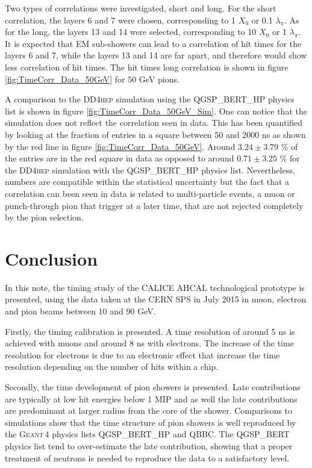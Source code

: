 \documentclass{JINST}
\newcommand\geant{\textsc{Geant\,4}\xspace}
\newcommand\ddhep{\textsc{DD4hep}\xspace}
\begin{document}
Two types of correlations were investigated, short and long. For the short correlation, the layers 6 and 7 were chosen, corresponding to 1 $X_0$ or 0.1 $\lambda_{\pi}$. As for the long, the layers 13 and 14 were selected, corresponding to 10 $X_0$ or 1 $\lambda_{\pi}$. It is expected that EM sub-showers can lead to a correlation of hit times for the layers 6 and 7, while the layers 13 and 14 are far apart, and therefore would show less correlation of hit times. The hit times long correlation is shown in figure \ref{fig:TimeCorr_Data_50GeV} for 50 GeV pions.

A comparison to the \ddhep simulation using the QGSP\_BERT\_HP physics list is shown in figure \ref{fig:TimeCorr_Data_50GeV_Sim}. One can notice that the simulation does not reflect the correlation seen in data. This has been quantified by looking at the fraction of entries in a square between 50 and 2000 ns as shown by the red line in figure \ref{fig:TimeCorr_Data_50GeV}. Around $3.24 \pm 3.79$ \% of the entries are in the red square in data as opposed to around $0.71 \pm 3.25$ \% for the \ddhep simulation with the QGSP\_BERT\_HP physics list. Nevertheless, numbers are compatible within the statistical uncertainty but the fact that a correlation can been seen in data is related to multi-particle events, a muon or punch-through pion that trigger at a later time, that are not rejected completely by the pion selection.

\section{Conclusion}

In this note, the timing study of the CALICE AHCAL technological prototype is presented, using the data taken at the CERN SPS in July 2015 in muon, electron and pion beams between 10 and 90 GeV.

Firstly, the timing calibration is presented. A time resolution of around 5 ns is achieved with muons and around 8 ns with electrons. The increase of the time resolution for electrons is due to an electronic effect that increase the time resolution depending on the number of hits within a chip.

Secondly, the time development of pion showers is presented. Late contributions are typically at low hit energies below 1 MIP and as well the late contributions are predominant at larger radius from the core of the shower. Comparisons to simulations show that the time structure of pion showers is well reproduced by the \geant physics lists QGSP\_BERT\_HP and QBBC. The QGSP\_BERT physics list tend to over-estimate the late contribution, showing that a proper treatment of neutrons is needed to reproduce the data to a satisfactory level.
\end{document}
